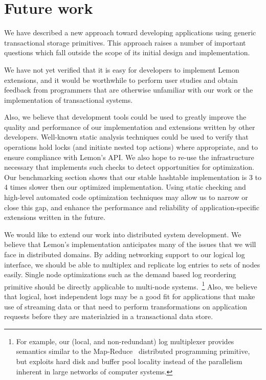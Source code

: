 \documentclass[letterpaper,twocolumn,english]{article}
\newcommand{\yad}{Lemon\xspace}
\begin{document}
\section{Future work}

We have described a new approach toward developing applications using
generic transactional storage primitives.  This approach raises a
number of important questions which fall outside the scope of its
initial design and implementation.

We have not yet verified that it is easy for developers to implement
\yad extensions, and it would be worthwhile to perform user studies
and obtain feedback from programmers that are otherwise unfamiliar
with our work or the implementation of transactional systems.

Also, we believe that development tools could be used to greatly
improve the quality and performance of our implementation and
extensions written by other developers.  Well-known static analysis
techniques could be used to verify that operations hold locks (and
initiate nested top actions) where appropriate, and to ensure
compliance with \yad's API.  We also hope to re-use the infrastructure
necessary that implements such checks to detect opportunities for
optimization.  Our benchmarking section shows that our stable
hashtable implementation is 3 to 4 times slower then our optimized
implementation.  Using static checking and high-level automated code
optimization techniques may allow us to narrow or close this
gap, and enhance the performance and reliability of application-specific 
extensions written in the future.

We would like to extend our work into distributed system
development.  We believe that \yad's implementation anticipates many
of the issues that we will face in distributed domains.  By adding 
networking support to our logical log interface,
we should be able to multiplex and replicate log entries to sets of
nodes easily.  Single node optimizations such as the demand based log
reordering primitive should be directly applicable to multi-node
systems.~\footnote{For example, our (local, and non-redundant) log
multiplexer provides semantics similar to the
Map-Reduce~\cite{mapReduce} distributed programming primitive, but
exploits hard disk and buffer pool locality instead of the parallelism
inherent in large networks of computer systems.}  Also, we believe
that logical, host independent logs may be a good fit for applications
that make use of streaming data or that need to perform
transformations on application requests before they are materialzied
in a transactional data store.
\end{document}
